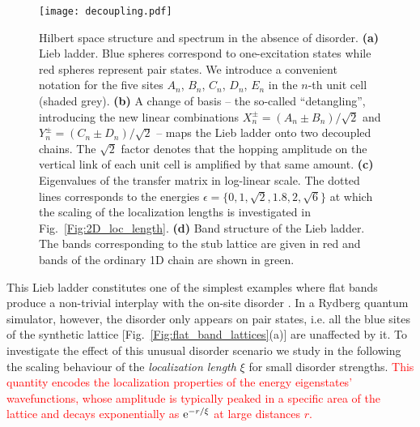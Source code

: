 \documentclass[prl,aps,twocolumn,showpacs,superscriptaddress,longbibliography]{revtex4-1}
\newcommand{\rme}[1]{{\rm{e}}^{#1}}
\newcommand{\changer}[1]{\textcolor{red}{#1}}
\begin{document}
\begin{figure}
\texttt{[image: decoupling.pdf]}
\caption{Hilbert space structure and spectrum in the absence of disorder. \textbf{(a)} Lieb ladder. Blue spheres correspond to one-excitation states while red spheres represent pair states. We introduce a convenient notation for the five sites $A_n$, $B_n$, $C_n$, $D_n$, $E_n$ in the $n$-th unit cell (shaded grey). \textbf{(b)} A change of basis -- the so-called ``detangling'', introducing the new linear combinations $X_n^\pm = (A_n \pm B_n)/\sqrt{2}$ and $Y_n^\pm = (C_n \pm D_n)/\sqrt{2}$ \cite{a_Flach_EPL_14,Leykam2017} -- maps the Lieb ladder onto two decoupled chains. The $\sqrt{2}$ factor denotes that the hopping amplitude on the vertical link of each unit cell is amplified by that same amount. \textbf{(c)} Eigenvalues of the transfer matrix in log-linear scale. The dotted lines corresponds to the energies $\epsilon = \{0,1, \sqrt 2, 1.8, 2, \sqrt 6\}$ at which the scaling of the localization lengths is investigated in Fig.~\ref{Fig:2D_loc_length}. \textbf{(d)} Band structure of the Lieb ladder. The bands corresponding to the stub lattice are given in red and bands of the ordinary 1D chain are shown in green.}
\label{Fig:decoupling}
\end{figure}

This Lieb ladder constitutes one of the simplest examples where flat bands produce a non-trivial interplay with the on-site disorder \cite{Leykam2017}. In a Rydberg quantum simulator, however, the disorder only appears on pair states, i.e. all the blue sites of the synthetic lattice [Fig.~\ref{Fig:flat_band_lattices}(a)] are unaffected by it. To investigate the effect of this unusual disorder scenario we study in the following the scaling behaviour of the \emph{localization length} $\xi$ for small disorder strengths. \changer{This quantity encodes the localization properties of the energy eigenstates' wavefunctions, whose amplitude is typically peaked in a specific area of the lattice and decays exponentially as $\rme{-r/\xi}$ at large distances $r$.}
\end{document}
